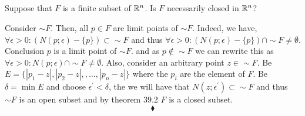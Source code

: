 \renewcommand{\thesubsection}{\thesection.\arabic{subsection}}
\setcounter{subsection}{0}

\subsection{}
\begin{tcolorbox}
Suppose that $F$ is a finite subset of $\mathbb{R}^n$. Is $F$ necessarily closed in $\mathbb{R}^n$?
\end{tcolorbox}
Consider $\sim F$. Then, all $p\in F$ are limit points of $\sim F$. Indeed, we have, $\forall \epsilon>0: \left(N(p;\epsilon)-\{p\}\right)\subset \sim F$ and thus $\forall \epsilon>0: \left(N(p;\epsilon)-\{p\}\right)\cap \sim F\neq \emptyset$. Conclusion $p$ is a limit point of $\sim F$. and as $p\not\in \sim F$ we can rewrite this as $\forall \epsilon>0: N(p;\epsilon)\cap \sim F\neq \emptyset$. Also, consider an arbitrary point $z\in\sim F$. Be $E=\{|p_1-z|,|p_2-z|,,\dots, |p_n-z|\}$ where the $p_i$ are the element of $F$. Be $\delta = \min E$ and choose $\epsilon^{'} < \delta$, the we will have that $N(z;\epsilon^{'})\subset \sim F$ and thus $\sim F$ is an open subset and by theorem $\mathbf{39.2}$ $F$ is a closed subset.
$$\blacklozenge$$\\


